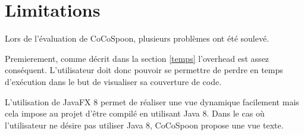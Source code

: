 \section{Limitations}

Lors de l'évaluation de CoCoSpoon, plusieurs problèmes ont été soulevé. \\  
\par Premierement, comme décrit dans la section \ref{temps} l'overhead est assez conséquent. L'utilisateur doit donc pouvoir se permettre de perdre en temps d'exécution dans le but de visualiser sa couverture de code.
\par L'utilisation de JavaFX 8 permet de réaliser une vue dynamique facilement mais cela impose au projet d'être compilé en utilisant Java 8. Dans le cas où l'utilisateur ne désire pas utiliser Java 8, CoCoSpoon propose une vue texte. 